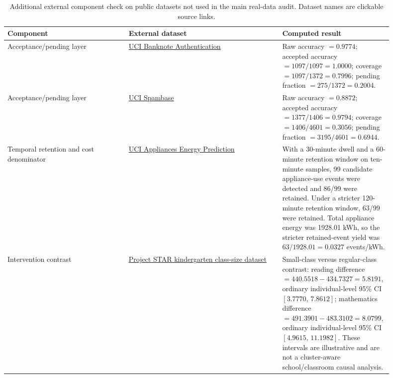 \documentclass[11pt,a4paper]{article}
\newcommand{\1}{\mathbf{1}}
\begin{document}
\begin{table}[h]
\centering
\caption{Additional external component check on public datasets not used in the main real-data audit. Dataset names are clickable source links.}
\label{tab:external-component-check}
\scriptsize
\begin{adjustbox}{max width=\linewidth}
\begin{tabular}{p{0.30\linewidth}p{0.38\linewidth}p{0.22\linewidth}}
\toprule
Component & External dataset & Computed result \\
\midrule
Acceptance/pending layer & \href{https://archive.ics.uci.edu/ml/machine-learning-databases/00267/data_banknote_authentication.txt}{UCI Banknote Authentication} & Raw accuracy $=0.9774$; accepted accuracy $=1097/1097=1.0000$; coverage $=1097/1372=0.7996$; pending fraction $=275/1372=0.2004$. \\
Acceptance/pending layer & \href{https://archive.ics.uci.edu/ml/machine-learning-databases/spambase/spambase.data}{UCI Spambase} & Raw accuracy $=0.8872$; accepted accuracy $=1377/1406=0.9794$; coverage $=1406/4601=0.3056$; pending fraction $=3195/4601=0.6944$. \\
Temporal retention and cost denominator & \href{https://archive.ics.uci.edu/ml/machine-learning-databases/00374/energydata_complete.csv}{UCI Appliances Energy Prediction} & With a 30-minute dwell and a 60-minute retention window on ten-minute samples, 99 candidate appliance-use events were detected and 86/99 were retained. Under a stricter 120-minute retention window, 63/99 were retained. Total appliance energy was 1928.01 kWh, so the stricter retained-event yield was $63/1928.01=0.0327$ events/kWh. \\
Intervention contrast & \href{https://vincentarelbundock.github.io/Rdatasets/csv/AER/STAR.csv}{Project STAR kindergarten class-size dataset} & Small-class versus regular-class contrast: reading difference $=440.5518-434.7327=5.8191$, ordinary individual-level 95\% CI $[3.7770,\,7.8612]$; mathematics difference $=491.3901-483.3102=8.0799$, ordinary individual-level 95\% CI $[4.9615,\,11.1982]$. These intervals are illustrative and are not a cluster-aware school/classroom causal analysis. \\
\bottomrule
\end{tabular}
\end{adjustbox}
\end{table}
\end{document}
